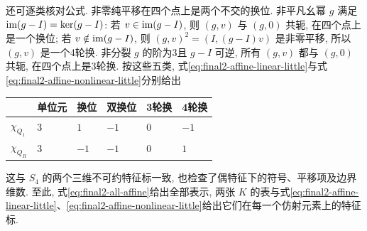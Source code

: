 \begin{solution}
还可逐类核对公式. 非零纯平移在四个点上是两个不交的换位. 非平凡幺幂 $g$ 满足 $\operatorname{im}(g-I)=\ker(g-I)$: 若 $v\in\operatorname{im}(g-I)$, 则 $(g,v)$ 与 $(g,0)$ 共轭, 在四个点上是一个换位; 若 $v\notin\operatorname{im}(g-I)$, 则 $(g,v)^2=(I,(g-I)v)$ 是非零平移, 所以 $(g,v)$ 是一个4轮换. 非分裂 $g$ 的阶为3且 $g-I$ 可逆, 所有 $(g,v)$ 都与 $(g,0)$ 共轭, 在四个点上是3轮换. 按这些五类, 式\eqref{eq:final2-affine-linear-little}与式\eqref{eq:final2-affine-nonlinear-little}分别给出
\begin{center}
\begin{tabular}{@{}llllll@{}}
\toprule
 & 单位元 & 换位 & 双换位 & 3轮换 & 4轮换 \\
\midrule
$\chi_{Q_1}$ & $3$ & $1$ & $-1$ & $0$ & $-1$ \\
$\chi_{Q_R}$ & $3$ & $-1$ & $-1$ & $0$ & $1$ \\
\bottomrule
\end{tabular}
\end{center}
这与 $S_4$ 的两个三维不可约特征标一致, 也检查了偶特征下的符号、平移项及边界维数. 至此, 式\eqref{eq:final2-all-affine}给出全部表示, 两张 $K$ 的表与式\eqref{eq:final2-affine-linear-little}、\eqref{eq:final2-affine-nonlinear-little}给出它们在每一个仿射元素上的特征标.
\end{solution}

